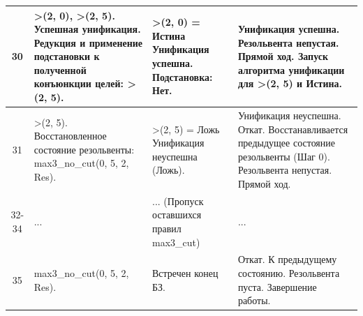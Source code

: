 \begin{tabularx}{\textwidth}{|c|>{\small}X|>{\small}X|>{\small}X|}
	30                                                                                 &
	>(2, 0), \newline
	>(2, 5). \newline
	Успешная унификация. \newline
	Редукция и применение подстановки к полученной конъюнкции целей: \newline
	>(2, 5).                                                                           &
	>(2, 0) = \newline
	Истина \newline
	Унификация успешна. \newline
	Подстановка: \newline
	Нет.                                                                               &
	Унификация успешна. \newline
	Резольвента непустая. \newline
	Прямой ход. \newline
	Запуск алгоритма унификации для >(2, 5) и Истина.                                            \\
	\hline

	31                                                                                 &
	>(2, 5). \newline
	Восстановленное состояние резольвенты: \newline
	max3\_no\_cut(0, 5, 2, Res).                                                       &
	>(2, 5) = \newline
	Ложь \newline
	Унификация неуспешна (Ложь).                                                       &
	Унификация неуспешна. \newline
	Откат. Восстанавливается предыдущее состояние резольвенты (Шаг 0). \newline
	Резольвента непустая. \newline
	Прямой ход.                                                                                  \\
	\hline

	32-34                                                                              &
	...                                                                                &
	... (Пропуск оставшихся правил max3\_cut)                                          &
	...                                                                                          \\
	\hline

	35                                                                                 &
	max3\_no\_cut(0, 5, 2, Res).                                                       &
	Встречен конец БЗ.                                                                 &
	Откат. К предыдущему состоянию. \newline
	Резольвента пуста. \newline
	Завершение работы.                                                                           \\
	\hline
\end{tabularx}

